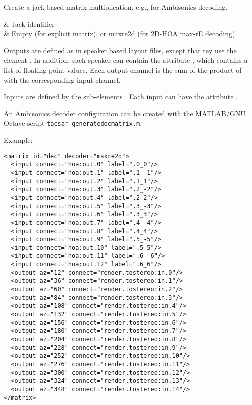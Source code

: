Create a jack based matrix multiplication, e.g., for Ambisonics decoding.

\begin{tscattributes}
 & Jack identifier\\
 & Empty (for explicit matrix), or maxre2d (for 2D-HOA max-rE decoding)\\
\end{tscattributes}

Outputs are defined as in speaker based layout files, except that tey
use the element .
%
In addition, each speaker can contain the attribute , which
contains a list of floating point values.
%
Each output channel is the sum of the product of  with the
corresponding input channel.

Inputs are defined by the sub-elements .
%
Each input can have the attribute .

An Ambisonics decoder configuration can be created with the MATLAB/GNU
Octave script \verb!tacsar_generatedecmatrix.m!.

Example:
\begin{lstlisting}[numbers=none]
<matrix id="dec" decoder="maxre2d">
  <input connect="hoa:out.0" label=".0_0"/>
  <input connect="hoa:out.1" label=".1_-1"/>
  <input connect="hoa:out.2" label=".1_1"/>
  <input connect="hoa:out.3" label=".2_-2"/>
  <input connect="hoa:out.4" label=".2_2"/>
  <input connect="hoa:out.5" label=".3_-3"/>
  <input connect="hoa:out.6" label=".3_3"/>
  <input connect="hoa:out.7" label=".4_-4"/>
  <input connect="hoa:out.8" label=".4_4"/>
  <input connect="hoa:out.9" label=".5_-5"/>
  <input connect="hoa:out.10" label=".5_5"/>
  <input connect="hoa:out.11" label=".6_-6"/>
  <input connect="hoa:out.12" label=".6_6"/>
  <output az="12" connect="render.tostereo:in.0"/>
  <output az="36" connect="render.tostereo:in.1"/>
  <output az="60" connect="render.tostereo:in.2"/>
  <output az="84" connect="render.tostereo:in.3"/>
  <output az="108" connect="render.tostereo:in.4"/>
  <output az="132" connect="render.tostereo:in.5"/>
  <output az="156" connect="render.tostereo:in.6"/>
  <output az="180" connect="render.tostereo:in.7"/>
  <output az="204" connect="render.tostereo:in.8"/>
  <output az="228" connect="render.tostereo:in.9"/>
  <output az="252" connect="render.tostereo:in.10"/>
  <output az="276" connect="render.tostereo:in.11"/>
  <output az="300" connect="render.tostereo:in.12"/>
  <output az="324" connect="render.tostereo:in.13"/>
  <output az="348" connect="render.tostereo:in.14"/>
</matrix>
\end{lstlisting}

